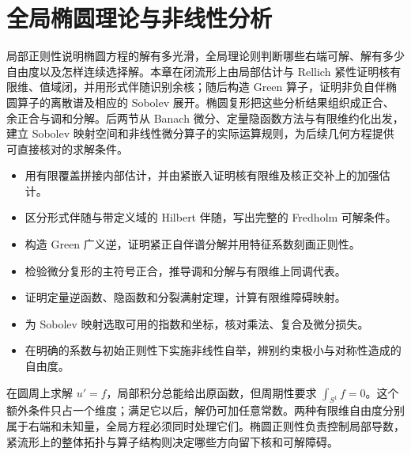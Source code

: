 
% 
% 

\chapter{全局椭圆理论与非线性分析}
\label{g3:ch:13}

\begin{chapterabstract}
局部正则性说明椭圆方程的解有多光滑，全局理论则判断哪些右端可解、解有多少自由度以及怎样连续选择解。本章在闭流形上由局部估计与 Rellich 紧性证明核有限维、值域闭，并用形式伴随识别余核；随后构造 Green 算子，证明非负自伴椭圆算子的离散谱及相应的 Sobolev 展开。椭圆复形把这些分析结果组织成正合、余正合与调和分解。后两节从 Banach 微分、定量隐函数方法与有限维约化出发，建立 Sobolev 映射空间和非线性微分算子的实际运算规则，为后续几何方程提供可直接核对的求解条件。
\end{chapterabstract}

\begin{learninggoals}
\begin{itemize}
	\item 用有限覆盖拼接内部估计，并由紧嵌入证明核有限维及核正交补上的加强估计。
	\item 区分形式伴随与带定义域的 Hilbert 伴随，写出完整的 Fredholm 可解条件。
	\item 构造 Green 广义逆，证明紧正自伴谱分解并用特征系数刻画正则性。
	\item 检验微分复形的主符号正合，推导调和分解与有限维上同调代表。
	\item 证明定量逆函数、隐函数和分裂满射定理，计算有限维障碍映射。
	\item 为 Sobolev 映射选取可用的指数和坐标，核对乘法、复合及微分损失。
	\item 在明确的系数与初始正则性下实施非线性自举，辨别约束极小与对称性造成的自由度。
\end{itemize}
\end{learninggoals}

在圆周上求解 \(u'=f\)，局部积分总能给出原函数，但周期性要求 \(\int_{S^1}f=0\)。这个额外条件只占一个维度；满足它以后，解仍可加任意常数。两种有限维自由度分别属于右端和未知量，全局方程必须同时处理它们。椭圆正则性负责控制局部导数，紧流形上的整体拓扑与算子结构则决定哪些方向留下核和可解障碍。


